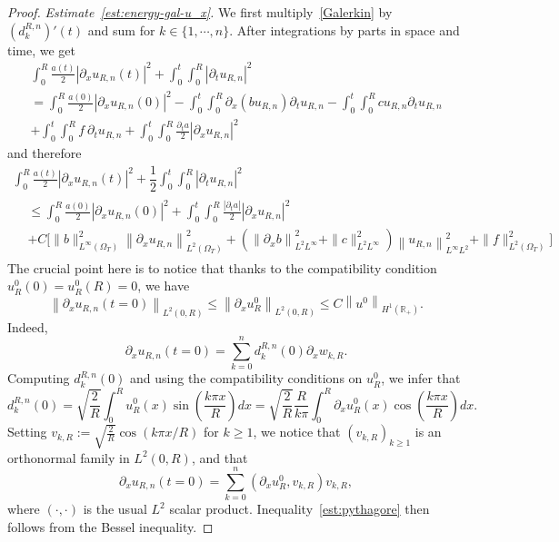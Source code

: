 \documentclass[AHL,Unicode,longabstracts,published]{cedram}
\newcommand{\R}{\mathbb{R}}
\newcommand{\p}{\partial}
\begin{document}
\begin{proof}

\emph{Estimate~\eqref{est:energy-gal-u_x}.}
We first multiply~\eqref{Galerkin} by $(d^{R,n}_k)'(t)$ and sum for $k\in \{1,\cdots, n\}$. After integrations by parts in space and time, we get
\begin{multline*}
\int_0^R \frac{a(t)}{2} \left|\partial_x u_{R,n}(t)\right|^2 + \int_0^t \int_0^R \left|\partial_t u_{R,n}\right|^2 \\
 = \int_0^R \frac{a(0)}{2}\left|\partial_x u_{R,n}(0)\right|^2 - \int_0^t \int_0^R \partial_x(b u_{R,n}) \partial_t u_{R,n} - \int_0^t \int_0^R c u_{R,n} \partial_t u_{R,n} \\
+ \int_0^t \int_0^R f \ \partial_t u_{R,n} + \int_0^t \int_0^R \frac{\partial_t a}{2}\left|\partial_x u_{R,n}\right|^2
\end{multline*}
and therefore
\begin{multline}\label{eq:du1}
\int_0^R \frac{a(t)}{2} \left|\partial_x u_{R,n}(t)\right|^2 + \dfrac{1}{2} \int_0^t \int_0^R \left|\partial_t u_{R,n}\right|^2 
\\
\begin{aligned}
 &\leq \int_0^R \frac{a(0)}{2} \left|\partial_x u_{R,n}(0)\right|^2 + \int_0^t \int_0^R \frac{|\partial_t a|}{2} \left|\partial_x u_{R,n}\right|^2 \\
&+ C \Big[
\|b\|_{L^\infty(\Omega_T)}^2 \left\|\partial_x u_{R,n}\right\|_{L^2(\Omega_T)}^2 +\left(\left\|\partial_x b\right\|_{L^2 L^\infty}^2 + \|c\|_{L^2 L^\infty}^2\right) \left\|u_{R,n}\right\|_{L^\infty L^2}^2 + \|f\|_{L^2(\Omega_T)}^2 \Big]
\end{aligned}
\end{multline}
The crucial point here is to notice that thanks to the compatibility condition $u_R^0(0)=u_R^0(R)=0$, we have
\begin{equation}\label{est:pythagore}
\left\| \p_x u_{R,n}(t=0)\right\|_{L^2(0,R)}\leq \left\| \p_x u_R^0\right\|_{L^2(0,R)}\leq C \left\| u^0\right\|_{H^1(\R_+)}.
\end{equation}
Indeed,
\[
\p_x u_{R,n}(t=0)=\sum_{k=0}^n d^{R,n}_k(0) \p_x w_{k,R}.
\]
Computing $d^{R,n}_k(0)$ and using the compatibility conditions on $u_R^0$, we infer that
\[
d^{R,n}_k(0)= \sqrt{\frac{2}{R}}\int_0^R u_R^0(x)\sin \left(\frac{k\pi x}{R}\right)dx=\sqrt{\frac{2}{R}}\frac{R}{k\pi}\int_0^R\p_x u_R^0(x)\cos \left(\frac{k\pi x}{R}\right)dx.
\]
Setting $v_{k,R}:=\sqrt{\frac{2}{R}}\cos(k\pi x/R)$ for $k\geq 1$, we notice that $(v_{k,R})_{k\geq 1}$ is an orthonormal family in $L^2(0,R)$, and that
\[
\p_x u_{R,n}(t=0)=\sum_{k=0}^n \left(\p_x u_R^0, v_{k,R}\right) v_{k,R},
\]
where $(\cdot,\cdot)$ is the usual $L^2$ scalar product. Inequality~\eqref{est:pythagore} then follows from the Bessel inequality.



\end{proof}
\end{document}
